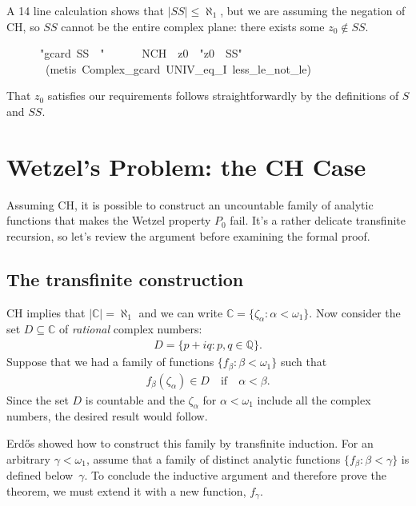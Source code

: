 \documentclass[runningheads]{llncs}
\begin{document}
A 14 line calculation shows that $|SS|\le\aleph_1$, but we are assuming the negation of CH, so $SS$ cannot be the entire complex plane: there exists some $z_0\not\in SS$.
\begin{isabelle}
\ \ \ \ \ \ "gcard\ SS\ \isasymle \ "\ \isanewline
\ \ \ \ \ NCH\ \ z0\ \ "z0\ \isasymnotin \ SS"\isanewline
\ \ \ \ \ \ \ (metis\ Complex\_gcard\ UNIV\_eq\_I\ less\_le\_not\_le)
\end{isabelle}

That $z_0$ satisfies our requirements follows straightforwardly by the definitions of $S$ and $SS$.

\section{Wetzel's Problem: the CH Case}

Assuming CH, it is possible to construct an uncountable family of analytic functions that makes the Wetzel property $P_0$ fail.
It's a rather delicate transfinite recursion, so let's review the argument before examining the formal proof.

\subsection{The transfinite construction}

CH implies that $|\mathbb{C}| = \aleph_1$ and we can write $\mathbb{C} = \{\zeta_\alpha : \alpha < \omega_1 \}$.
Now consider the set $D\subseteq\mathbb{C}$ of \textit{rational} complex numbers: 
\begin{align*}
 D = \{p+iq: p,q\in\mathbb{Q}\}.
\end{align*}
Suppose that we had a family of functions 
 $\{f_\beta : \beta < \omega_1 \}$ such that 
\begin{align}\label{eqn:f_in_D}
	f_\beta (\zeta_\alpha) \in D\quad\text{if}\quad\alpha<\beta.
\end{align} 
 Since the set $D$ is countable and the $\zeta_\alpha$ for $\alpha < \omega_1$ include all the complex numbers, the desired result would follow.

Erd\H{o}s showed how to construct this family by transfinite induction. For an arbitrary $\gamma<\omega_1$, assume that a family of distinct analytic functions $\{f_\beta: \beta<\gamma\}$ is defined below~$\gamma$.
To conclude the inductive argument and therefore prove the theorem, we must extend it with a new function, $f_\gamma$.
\end{document}
